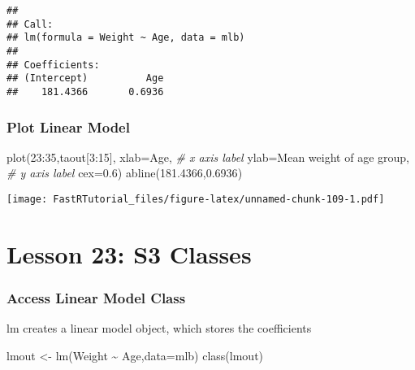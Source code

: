 \documentclass[
]{article}
\newenvironment{Shaded}{\begin{snugshade}}{\end{snugshade}}
\newcommand{\AttributeTok}[1]{\textcolor[rgb]{0.77,0.63,0.00}{#1}}
\newcommand{\CommentTok}[1]{\textcolor[rgb]{0.56,0.35,0.01}{\textit{#1}}}
\newcommand{\DecValTok}[1]{\textcolor[rgb]{0.00,0.00,0.81}{#1}}
\newcommand{\FloatTok}[1]{\textcolor[rgb]{0.00,0.00,0.81}{#1}}
\newcommand{\FunctionTok}[1]{\textcolor[rgb]{0.00,0.00,0.00}{#1}}
\newcommand{\NormalTok}[1]{#1}
\newcommand{\OtherTok}[1]{\textcolor[rgb]{0.56,0.35,0.01}{#1}}
\newcommand{\SpecialCharTok}[1]{\textcolor[rgb]{0.00,0.00,0.00}{#1}}
\newcommand{\StringTok}[1]{\textcolor[rgb]{0.31,0.60,0.02}{#1}}
\begin{document}
\begin{verbatim}
## 
## Call:
## lm(formula = Weight ~ Age, data = mlb)
## 
## Coefficients:
## (Intercept)          Age  
##    181.4366       0.6936
\end{verbatim}

\hypertarget{plot-linear-model}{%
\subsubsection{Plot Linear Model}\label{plot-linear-model}}

\begin{Shaded}
\begin{Highlighting}[]
\FunctionTok{plot}\NormalTok{(}\DecValTok{23}\SpecialCharTok{:}\DecValTok{35}\NormalTok{,taout[}\DecValTok{3}\SpecialCharTok{:}\DecValTok{15}\NormalTok{],}
     \AttributeTok{xlab=}\StringTok{\textquotesingle{}Age\textquotesingle{}}\NormalTok{,    }\CommentTok{\# x axis label}
     \AttributeTok{ylab=}\StringTok{\textquotesingle{}Mean weight of age group\textquotesingle{}}\NormalTok{,   }\CommentTok{\# y axis label}
     \AttributeTok{cex=}\FloatTok{0.6}\NormalTok{)}
\FunctionTok{abline}\NormalTok{(}\FloatTok{181.4366}\NormalTok{,}\FloatTok{0.6936}\NormalTok{)}
\end{Highlighting}
\end{Shaded}

\texttt{[image: FastRTutorial\_files/figure-latex/unnamed-chunk-109-1.pdf]}

\hypertarget{lesson-23-s3-classes}{%
\section{Lesson 23: S3 Classes}\label{lesson-23-s3-classes}}

\hypertarget{access-linear-model-class}{%
\subsubsection{Access Linear Model
Class}\label{access-linear-model-class}}

lm creates a linear model object, which stores the coefficients

\begin{Shaded}
\begin{Highlighting}[]
\NormalTok{lmout }\OtherTok{\textless{}{-}} \FunctionTok{lm}\NormalTok{(Weight }\SpecialCharTok{\textasciitilde{}}\NormalTok{ Age,}\AttributeTok{data=}\NormalTok{mlb)}
\FunctionTok{class}\NormalTok{(lmout)}
\end{Highlighting}
\end{Shaded}
\end{document}
